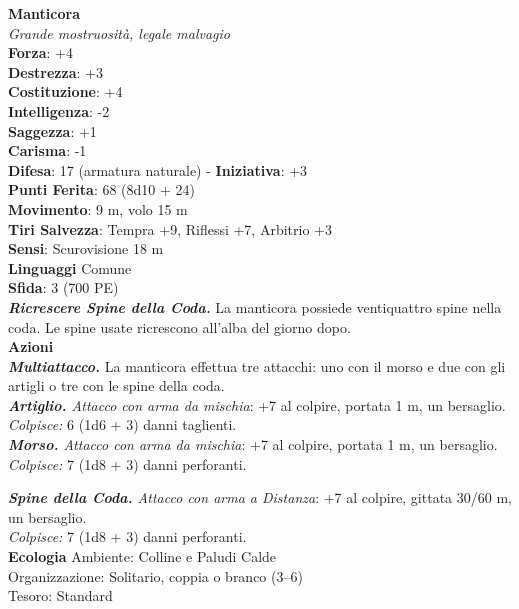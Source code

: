 \begin{multicols}{2}
\medskip\textbf{Manticora}\\
\emph{Grande mostruosità, legale malvagio}\\
\textbf{Forza}: +4\\
\textbf{Destrezza}: +3\\
\textbf{Costituzione}: +4\\
\textbf{Intelligenza}: -2\\
\textbf{Saggezza}: +1\\
\textbf{Carisma}: -1\\
\textbf{Difesa}: 17 (armatura naturale) - \textbf{Iniziativa}: +3\\
\textbf{Punti Ferita}: 68 (8d10 + 24)\\
\textbf{Movimento}: 9 m, volo 15 m\\
\textbf{Tiri Salvezza}: Tempra +9, Riflessi +7, Arbitrio +3\\
\textbf{Sensi}: Scurovisione 18 m\\
\textbf{Linguaggi} Comune\\
\textbf{Sfida}: 3 (700 PE)\smallskip\\
\emph{\textbf{Ricrescere Spine della Coda.}} La manticora possiede ventiquattro spine nella coda. Le spine usate ricrescono all'alba del giorno dopo.\\

\smallskip\textbf{Azioni}\\

\emph{\textbf{Multiattacco.}} La manticora effettua tre attacchi: uno con il morso e due con gli artigli o tre con le spine della coda.\\

\emph{\textbf{Artiglio.} Attacco con arma da mischia}: +7 al colpire, portata 1 m, un bersaglio.\\

\emph{Colpisce:} 6 (1d6 + 3) danni taglienti.\\

\emph{\textbf{Morso.} Attacco con arma da mischia}: +7 al colpire, portata 1 m, un bersaglio.\\

\emph{Colpisce:} 7 (1d8 + 3) danni perforanti.

\emph{\textbf{Spine della Coda.} Attacco con arma a Distanza}: +7 al colpire, gittata 30/60 m, un bersaglio.\\

\emph{Colpisce:} 7 (1d8 + 3) danni perforanti.\\
\textbf{Ecologia}
Ambiente: Colline e Paludi Calde\\
Organizzazione: Solitario, coppia o branco (3–6)\\
Tesoro: Standard\\


\end{multicols}
